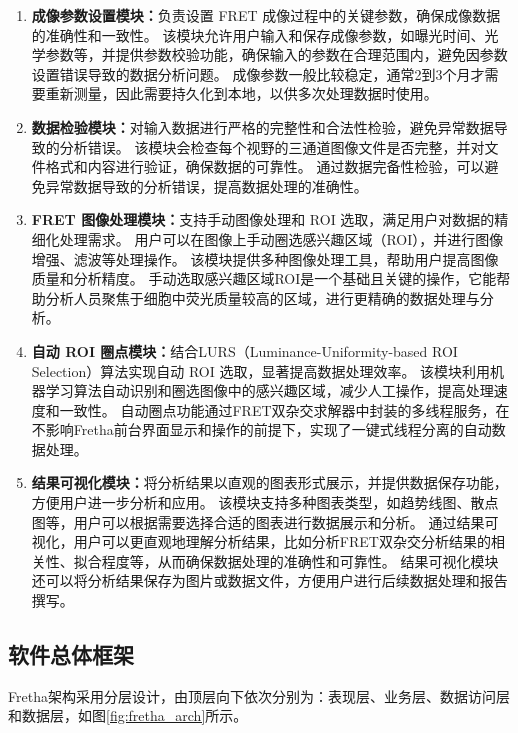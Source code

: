 \begin{enumerate}
  \item \textbf{成像参数设置模块：}负责设置 FRET 成像过程中的关键参数，确保成像数据的准确性和一致性。
  该模块允许用户输入和保存成像参数，如曝光时间、光学参数等，并提供参数校验功能，确保输入的参数在合理范围内，避免因参数设置错误导致的数据分析问题。
  成像参数一般比较稳定，通常2到3个月才需要重新测量，因此需要持久化到本地，以供多次处理数据时使用。
  \item \textbf{数据检验模块：}对输入数据进行严格的完整性和合法性检验，避免异常数据导致的分析错误。
  该模块会检查每个视野的三通道图像文件是否完整，并对文件格式和内容进行验证，确保数据的可靠性。
  通过数据完备性检验，可以避免异常数据导致的分析错误，提高数据处理的准确性。
  \item \textbf{FRET 图像处理模块：}支持手动图像处理和 ROI 选取，满足用户对数据的精细化处理需求。
  用户可以在图像上手动圈选感兴趣区域（ROI），并进行图像增强、滤波等处理操作。
  该模块提供多种图像处理工具，帮助用户提高图像质量和分析精度。
  手动选取感兴趣区域ROI是一个基础且关键的操作，它能帮助分析人员聚焦于细胞中荧光质量较高的区域，进行更精确的数据处理与分析。
  \item \textbf{自动 ROI 圈点模块：}结合LURS（Luminance-Uniformity-based ROI Selection）算法实现自动 ROI 选取，显著提高数据处理效率。
  该模块利用机器学习算法自动识别和圈选图像中的感兴趣区域，减少人工操作，提高处理速度和一致性。
  自动圈点功能通过FRET双杂交求解器中封装的多线程服务，在不影响Fretha前台界面显示和操作的前提下，实现了一键式线程分离的自动数据处理。
  \item \textbf{结果可视化模块：}将分析结果以直观的图表形式展示，并提供数据保存功能，方便用户进一步分析和应用。
  该模块支持多种图表类型，如趋势线图、散点图等，用户可以根据需要选择合适的图表进行数据展示和分析。
  通过结果可视化，用户可以更直观地理解分析结果，比如分析FRET双杂交分析结果的相关性、拟合程度等，从而确保数据处理的准确性和可靠性。
  结果可视化模块还可以将分析结果保存为图片或数据文件，方便用户进行后续数据处理和报告撰写。
  
\end{enumerate}

\subsection{软件总体框架}

Fretha架构采用分层设计，由顶层向下依次分别为：表现层、业务层、数据访问层和数据层，如图\ref{fig:fretha_arch}所示。

